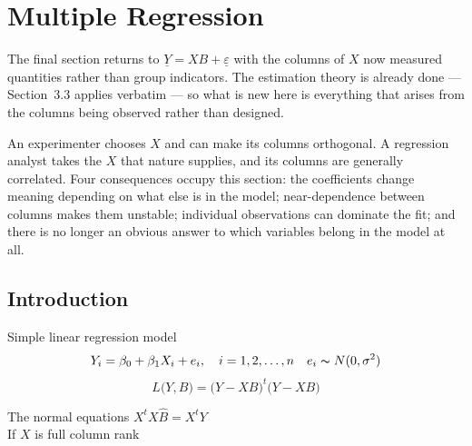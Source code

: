 \documentclass[11pt,a4paper]{article}
\theoremstyle{definition}
\begin{document}
\section{Multiple Regression}
The final section returns to $\underline{Y}=XB+\underline{\varepsilon}$ with
the columns of $X$ now measured quantities rather than group indicators. The
estimation theory is already done --- Section~3.3 applies verbatim --- so what
is new here is everything that arises from the columns being observed rather
than designed.

An experimenter chooses $X$ and can make its columns orthogonal. A regression
analyst takes the $X$ that nature supplies, and its columns are generally
correlated. Four consequences occupy this section: the coefficients change
meaning depending on what else is in the model; near-dependence between columns
makes them unstable; individual observations can dominate the fit; and there
is no longer an obvious answer to which variables belong in the model at all.

\subsection{Introduction}
Simple linear regression model
$$Y_i=\beta_0+\beta_1X_i+e_i,\quad  i=1,2,\ldots ,n\quad  e_i\thicksim N(0,\sigma^2)$$
$$L\big(Y,B\big)=\big(Y-XB\big)^t\big(Y-XB\big)$$

The normal equations $X^tX\widehat{B}=X^tY$\\

If $X$ is full column rank 
\end{document}

